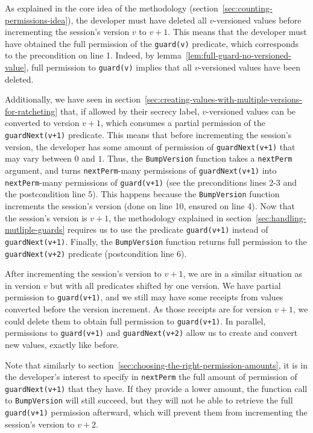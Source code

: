 As explained in the core idea of the methodology (section~\ref{sec:counting-permissions-idea}), the developer must have deleted all $v$-versioned values before incrementing the session's version $v$ to $v+1$. This means that the developer must have obtained the full permission of the \texttt{guard(v)} predicate, which corresponds to the precondition on line 1.
Indeed, by lemma~\ref{lem:full-guard-no-versioned-value}, full permission to \texttt{guard(v)} implies that all $v$-versioned values have been deleted.

Additionally, we have seen in section~\ref{sec:creating-values-with-multiple-versions-for-ratcheting} that, if allowed by their secrecy label, $v$-versioned values can be converted to version $v+1$, which consumes a partial permission of the \texttt{guardNext(v+1)} predicate.
This means that before incrementing the session's version, the developer has some amount of permission of \texttt{guardNext(v+1)} that may vary between $0$ and $1$.
Thus, the \texttt{BumpVersion} function takes a \texttt{nextPerm} argument, and turns \texttt{nextPerm}-many permissions of \texttt{guardNext(v+1)} into \texttt{nextPerm}-many permissions of \texttt{guard(v+1)} (see the preconditions lines 2-3 and the postcondition line 5).
This happens because the \texttt{BumpVersion} function increments the session's version (done on line 10, ensured on line 4).
Now that the session's version is $v+1$, the methodology explained in section~\ref{sec:handling-mutliple-guards} requires us to use the predicate \texttt{guard(v+1)} instead of \texttt{guardNext(v+1)}.
Finally, the \texttt{BumpVersion} function returns full permission to the \texttt{guardNext(v+2)} predicate (postcondition line 6).

After incrementing the session's version to $v+1$, we are in a similar situation as in version $v$ but with all predicates shifted by one version.
We have partial permission to \texttt{guard(v+1)}, and we still may have some receipts from values converted before the version increment.
As those receipts are for version $v+1$, we could delete them to obtain full permission to \texttt{guard(v+1)}.
In parallel, permissions to \texttt{guard(v+1)} and \texttt{guardNext(v+2)} allow us to create and convert new values, exactly like before.

Note that similarly to section~\ref{sec:choosing-the-right-permission-amounts}, it is in the developer's interest to specify in \texttt{nextPerm} the full amount of permission of \texttt{guardNext(v+1)} that they have. If they provide a lower amount, the function call to \texttt{BumpVersion} will still succeed, but they will not be able to retrieve the full \texttt{guard(v+1)} permission afterward, which will prevent them from incrementing the session's version to $v+2$.

